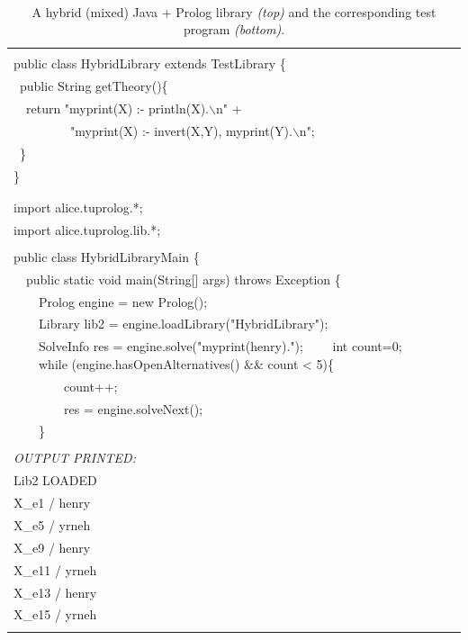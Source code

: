 \begin{table}
    \begin{center}{\tt
    \begin{tabular}{p{12cm}}\hline
    \\
    public class HybridLibrary extends TestLibrary \{\\
    ~public String getTheory()\{\\
    ~~return "myprint(X) :- println(X).$\backslash$n" +\\
    ~~~~~~~~~"myprint(X) :- invert(X,Y), myprint(Y).$\backslash$n";\\
    ~\}\\
    \} \\
    \\
    \hline
    \\
    import alice.tuprolog.*;\\
    import alice.tuprolog.lib.*;\\
    \\
    public class HybridLibraryMain \{\\
    ~~public static void main(String[] args) throws Exception \{\\
	~~~~Prolog engine = new Prolog();\\
	~~~~Library lib2 = engine.loadLibrary("HybridLibrary");\\
	~~~~SolveInfo res = engine.solve("myprint(henry).");
	~~~~int count=0;
	~~~~while (engine.hasOpenAlternatives() \&\& count < 5)\{\\
	~~~~~~~~count++;\\
	~~~~~~~~res = engine.solveNext();\\
	~~~~\}\\
    \\
    \textrm{\textit{OUTPUT PRINTED:}}\\
    Lib2  LOADED\\
	X\_e1 / henry\\
	X\_e5 / yrneh\\
	X\_e9 / henry\\
	X\_e11 / yrneh\\
	X\_e13 / henry\\
	X\_e15 / yrneh\\
    \\\hline
    \end{tabular}
    }\end{center}
    \caption{A hybrid (mixed) Java + Prolog library \textit{(top)} and the corresponding test program \textit{(bottom)}. }
    \label{tab:HybridLibrary}
\end{table}

